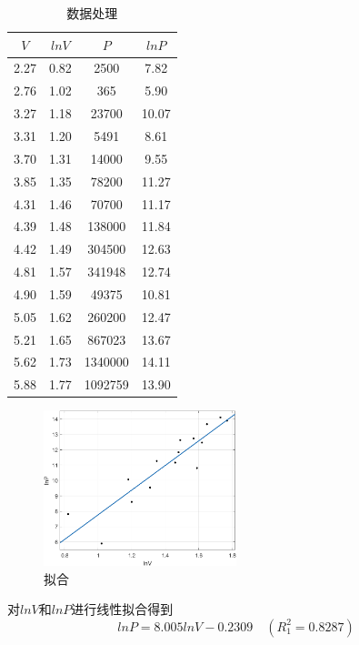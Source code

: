 \documentclass{article}
\begin{document}
\begin{table}[!h]
\begin{center}
\begin{tabular}{|c|c|c|c|}
    \hline
    $V$ & $lnV$ & $P$ & $lnP$ \\
    \hline
    2.27 & 0.82 & 2500 & 7.82\\
    \hline
    2.76 & 1.02 & 365 & 5.90\\
    \hline
    3.27 & 1.18 & 23700 & 10.07\\
    \hline
    3.31 & 1.20 & 5491 & 8.61\\
    \hline
    3.70 & 1.31 & 14000 & 9.55\\
    \hline
    3.85 & 1.35 & 78200 & 11.27\\
    \hline
    4.31 & 1.46 & 70700 & 11.17\\
    \hline
    4.39 & 1.48 & 138000 & 11.84\\
    \hline
    4.42 & 1.49 & 304500 & 12.63\\
    \hline
    4.81 & 1.57 & 341948 & 12.74\\
    \hline
    4.90 & 1.59 & 49375 & 10.81\\
    \hline
    5.05 & 1.62 & 260200 & 12.47\\
    \hline
    5.21 & 1.65 & 867023 & 13.67\\
    \hline
    5.62 & 1.73 & 1340000 & 14.11\\
    \hline
    5.88 & 1.77 & 1092759 & 13.90\\
    \hline
\end{tabular}
\caption{\label{demo-table}数据处理}
\end{center}
\end{table}

\begin{figure}[!h]
    \centering
    \includegraphics[width=0.5\textwidth]{picture/hw4_3.png}
    \caption{拟合}
\end{figure}

对$lnV$和$lnP$进行线性拟合得到
\[lnP = 8.005lnV - 0.2309 \quad  (R_1^2 = 0.8287)\]
\end{document}
